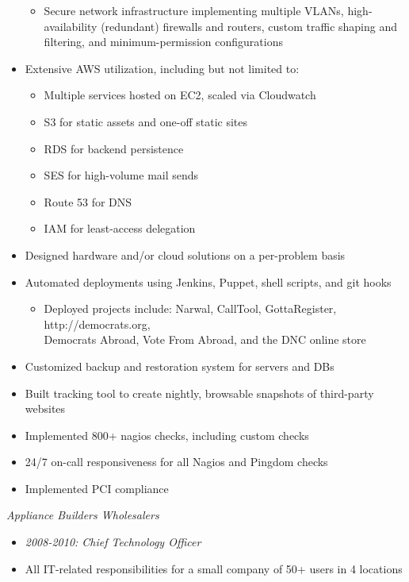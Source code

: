 \documentclass[11pt]{res} %
\begin{document}
\begin{resume}
\begin{itemize}
\begin{itemize}
                    \item Secure network infrastructure implementing multiple VLANs, high-availability (redundant) firewalls and routers, custom traffic shaping and filtering, and minimum-permission configurations
                \end{itemize}
            \item Extensive AWS utilization, including but not limited to:
                \begin{itemize}
                    \item Multiple services hosted on EC2, scaled via Cloudwatch
                    \item S3 for static assets and one-off static sites
                    \item RDS for backend persistence
                    \item SES for high-volume mail sends
                    \item Route 53 for DNS
                    \item IAM for least-access delegation
                \end{itemize}
            \item Designed hardware and/or cloud solutions on a per-problem basis
            \item Automated deployments using Jenkins, Puppet, shell scripts, and git hooks
                \begin{itemize}
                    \item Deployed projects include: Narwal, CallTool, GottaRegister, http://democrats.org, \\Democrats Abroad, Vote From Abroad, and the DNC online store
                \end{itemize}
            \item Customized backup and restoration system for servers and DBs
            \item Built tracking tool to create nightly, browsable snapshots of third-party websites
            \item Implemented 800+ nagios checks, including custom checks
            \item 24/7 on-call responsiveness for all Nagios and Pingdom checks
            \item Implemented PCI compliance
        \end{itemize}


{\sl Appliance Builders Wholesalers} 
    \begin{itemize} 
        \item {\sl 2008-2010: Chief Technology Officer}
        \item All IT-related responsibilities for a small company of 50+ users in 4 locations
    \end{itemize}


\end{resume}
\end{document}
